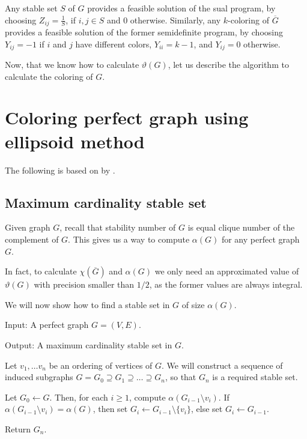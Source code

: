 Any stable set $S$ of $G$ provides a feasible solution of the sual program, by choosing $Z_{ij} = \frac{1}{S}$, if $i, j \in S$ and 0 otherwise. Similarly, any $k$-coloring of $\overline{G}$ provides a feasible solution of the former semidefinite program, by choosing $Y_{ij} = -1$ if $i$ and $j$ have different colors, $Y_{ii} = k-1$, and $Y_{ij} = 0$ otherwise.

Now, that we know how to calculate $\vartheta(G)$, let us describe the algorithm to calculate the coloring of $G$.

\section{Coloring perfect graph using ellipsoid method}
\label{sec:coloringEllipsoid}
The following is based on  by \citeauthor{Laurent2005} \cite{Laurent2005}.

\subsection{Maximum cardinality stable set}

Given graph $G$, recall that stability number of $G$ is equal clique number of the complement of $G$. This gives us a way to compute $\alpha(G)$ for any perfect graph $G$.

In fact, to calculate $\chi(\overline{G})$ and $\alpha(G)$ we only need an approximated value of $\vartheta(G)$ with precision smaller than $1/2$, as the former values are always integral.

We will now show how to find a stable set in $G$ of size $\alpha(G)$.

\begin{alg}
  \label{alg:maxStableSet}
  Input: A perfect graph $G = (V, E)$.

  \noindent Output: A maximum cardinality stable set in $G$.
\end{alg}
\begin{algtext2}
  Let $v_1, \ldots v_n$ be an ordering of vertices of $G$. We will construct a sequence of induced subgraphs $G = G_0 \supseteq G_1 \supseteq \ldots \supseteq G_n$, so that $G_n$ is a required stable set.

  Let $G_0 \leftarrow G$. Then, for each $i \geq 1$, compute $\alpha(G_{i-1} \setminus v_i)$. If $\alpha(G_{i-1} \setminus v_i) = \alpha(G)$, then set $G_i \leftarrow G_{i-1} \setminus \{v_i\}$, else set $G_i \leftarrow G_{i-1}$.

  Return $G_n$.
\end{algtext2}

